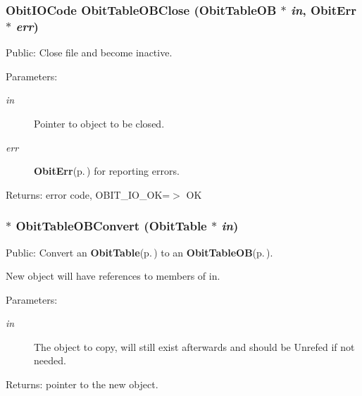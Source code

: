 \subsubsection{\setlength{\rightskip}{0pt plus 5cm}Obit\-IOCode Obit\-Table\-OBClose ({\bf Obit\-Table\-OB} $\ast$ {\em in}, {\bf Obit\-Err} $\ast$ {\em err})}\label{ObitTableOB_8c_a25}


Public: Close file and become inactive. 

\begin{Desc}
\item[Parameters:]
\begin{description}
\item[{\em in}]Pointer to object to be closed. \item[{\em err}]{\bf Obit\-Err}{\rm (p.\,\pageref{structObitErr})} for reporting errors. \end{description}
\end{Desc}
\begin{Desc}
\item[Returns:]error code, OBIT\_\-IO\_\-OK=$>$ OK \end{Desc}
\subsubsection{$\ast$ Obit\-Table\-OBConvert ({\bf Obit\-Table} $\ast$ {\em in})}\label{ObitTableOB_8c_a19}


Public: Convert an {\bf Obit\-Table}{\rm (p.\,\pageref{structObitTable})} to an {\bf Obit\-Table\-OB}{\rm (p.\,\pageref{structObitTableOB})}. 

New object will have references to members of in. \begin{Desc}
\item[Parameters:]
\begin{description}
\item[{\em in}]The object to copy, will still exist afterwards and should be Unrefed if not needed. \end{description}
\end{Desc}
\begin{Desc}
\item[Returns:]pointer to the new object. \end{Desc}
